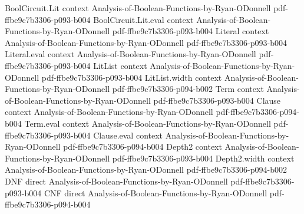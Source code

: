 \begin{lemma}
\leanok
{}
\proofstep
  {BoolCircuit.Lit}
  {context}
  {Analysis-of-Boolean-Functions-by-Ryan-ODonnell}
  {pdf-ffbe9c7b3306-p093-b004}
\proofstep
  {BoolCircuit.Lit.eval}
  {context}
  {Analysis-of-Boolean-Functions-by-Ryan-ODonnell}
  {pdf-ffbe9c7b3306-p093-b004}
\proofstep
  {Literal}
  {context}
  {Analysis-of-Boolean-Functions-by-Ryan-ODonnell}
  {pdf-ffbe9c7b3306-p093-b004}
\proofstep
  {Literal.eval}
  {context}
  {Analysis-of-Boolean-Functions-by-Ryan-ODonnell}
  {pdf-ffbe9c7b3306-p093-b004}
\proofstep
  {LitList}
  {context}
  {Analysis-of-Boolean-Functions-by-Ryan-ODonnell}
  {pdf-ffbe9c7b3306-p093-b004}
\proofstep
  {LitList.width}
  {context}
  {Analysis-of-Boolean-Functions-by-Ryan-ODonnell}
  {pdf-ffbe9c7b3306-p094-b002}
\proofstep
  {Term}
  {context}
  {Analysis-of-Boolean-Functions-by-Ryan-ODonnell}
  {pdf-ffbe9c7b3306-p093-b004}
\proofstep
  {Clause}
  {context}
  {Analysis-of-Boolean-Functions-by-Ryan-ODonnell}
  {pdf-ffbe9c7b3306-p094-b004}
\proofstep
  {Term.eval}
  {context}
  {Analysis-of-Boolean-Functions-by-Ryan-ODonnell}
  {pdf-ffbe9c7b3306-p093-b004}
\proofstep
  {Clause.eval}
  {context}
  {Analysis-of-Boolean-Functions-by-Ryan-ODonnell}
  {pdf-ffbe9c7b3306-p094-b004}
\proofstep
  {Depth2}
  {context}
  {Analysis-of-Boolean-Functions-by-Ryan-ODonnell}
  {pdf-ffbe9c7b3306-p093-b004}
\proofstep
  {Depth2.width}
  {context}
  {Analysis-of-Boolean-Functions-by-Ryan-ODonnell}
  {pdf-ffbe9c7b3306-p094-b002}
\proofstep
  {DNF}
  {direct}
  {Analysis-of-Boolean-Functions-by-Ryan-ODonnell}
  {pdf-ffbe9c7b3306-p093-b004}
\proofstep
  {CNF}
  {direct}
  {Analysis-of-Boolean-Functions-by-Ryan-ODonnell}
  {pdf-ffbe9c7b3306-p094-b004}
\proofstep

\end{lemma}
